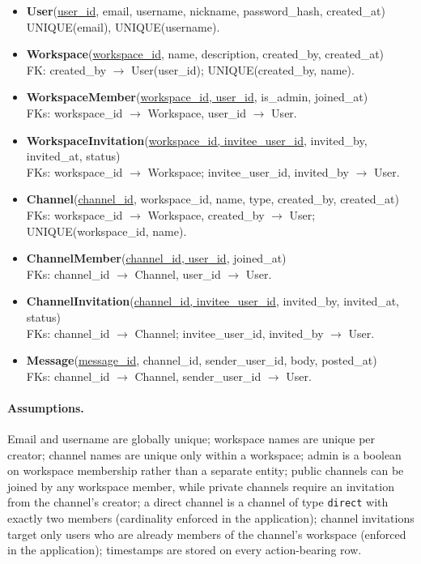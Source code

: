 \documentclass[11pt,letterpaper]{article}
\begin{document}
\begin{itemize}[leftmargin=1.4em,itemsep=1pt]
  \item \textbf{User}(\underline{user\_id}, email, username, nickname, password\_hash, created\_at)\\
        UNIQUE(email), UNIQUE(username).
  \item \textbf{Workspace}(\underline{workspace\_id}, name, description, created\_by, created\_at)\\
        FK: created\_by $\to$ User(user\_id); UNIQUE(created\_by, name).
  \item \textbf{WorkspaceMember}(\underline{workspace\_id, user\_id}, is\_admin, joined\_at)\\
        FKs: workspace\_id $\to$ Workspace, user\_id $\to$ User.
  \item \textbf{WorkspaceInvitation}(\underline{workspace\_id, invitee\_user\_id}, invited\_by, invited\_at, status)\\
        FKs: workspace\_id $\to$ Workspace; invitee\_user\_id, invited\_by $\to$ User.
  \item \textbf{Channel}(\underline{channel\_id}, workspace\_id, name, type, created\_by, created\_at)\\
        FKs: workspace\_id $\to$ Workspace, created\_by $\to$ User; UNIQUE(workspace\_id, name).
  \item \textbf{ChannelMember}(\underline{channel\_id, user\_id}, joined\_at)\\
        FKs: channel\_id $\to$ Channel, user\_id $\to$ User.
  \item \textbf{ChannelInvitation}(\underline{channel\_id, invitee\_user\_id}, invited\_by, invited\_at, status)\\
        FKs: channel\_id $\to$ Channel; invitee\_user\_id, invited\_by $\to$ User.
  \item \textbf{Message}(\underline{message\_id}, channel\_id, sender\_user\_id, body, posted\_at)\\
        FKs: channel\_id $\to$ Channel, sender\_user\_id $\to$ User.
\end{itemize}

\paragraph{Assumptions.}
Email and username are globally unique; workspace names are unique per creator;
channel names are unique only within a workspace; admin is a boolean on
workspace membership rather than a separate entity; public channels can be
joined by any workspace member, while private channels require an invitation
from the channel's creator; a direct channel is a channel of type
\texttt{direct} with exactly two members (cardinality enforced in the
application); channel invitations target only users who are already members of
the channel's workspace (enforced in the application); timestamps are stored on
every action-bearing row.
\end{document}
